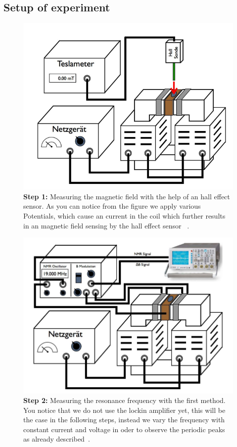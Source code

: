 \subsection{Setup of experiment}
\begin{figure}[htpb]
    \centering
    \includegraphics[width=0.8\linewidth]{figures/setup1}
    \caption{\textbf{Step 1:} Measuring the magnetic field with the help of 
       an hall effect sensor. As you can notice from the figure we 
      apply various Potentials, which cause an current in the coil which
      further results in an magnetic field sensing by the hall effect sensor
      ~\cite{ver}.}
    \label{fig:figures/setup1}
\end{figure}
\begin{figure}[htpb]
    \centering
    \includegraphics[width=0.8\linewidth]{figures/setup2}
    \caption{\textbf{Step 2:} Measuring the resonance frequency with the first
        method. You notice that we do not use the lockin amplifier yet,
        this will be the case in the following steps, instead we vary the
        frequency with constant current and voltage in oder to observe
        the periodic peaks as already described~\cite{ver}. }
    \label{fig:figures/setup1}
\end{figure}
